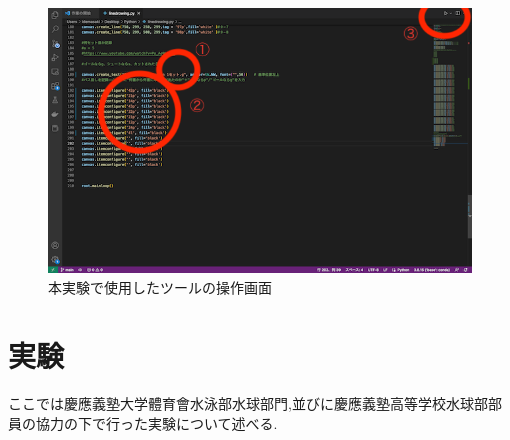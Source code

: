 \documentclass[../main.tex]{subfiles}
\begin{document}
\begin{figure}[ht]
    \begin{center}
        \includegraphics{img/03.png}
        \caption{本実験で使用したツールの操作画面}
    \label{img:screen}
    \end{center}
\end{figure}



\section{実験}
ここでは慶應義塾大学體育會水泳部水球部門,並びに慶應義塾高等学校水球部部員の協力の下で行った実験について述べる.
\end{document}
